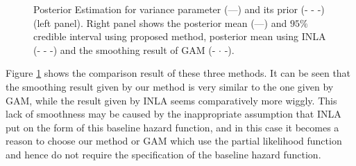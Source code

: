 \documentclass[]{article}
\begin{document}
\begin{figure}[ht]
\centering
{}

\caption{Posterior Estimation for variance parameter (---) and its prior (- - -)  (left panel). Right panel shows the posterior mean (---) and $95\%$ credible interval using proposed method, posterior mean using INLA (- - -) and the smoothing result of GAM (- $\cdot$ -).}
\label{fig:leuk}
\end{figure}


Figure \ref{fig:leuk} shows the comparison result of these three methods. It can be seen that the smoothing result given by our method is very similar to the one given by GAM, while the result given by INLA seems comparatively more wiggly. This lack of smoothness may be caused by the inappropriate assumption that INLA put on the form of this baseline hazard function, and in this case it becomes a reason to choose our method or GAM which use the partial likelihood function and hence do not require the specification of the baseline hazard function.
\end{document}

